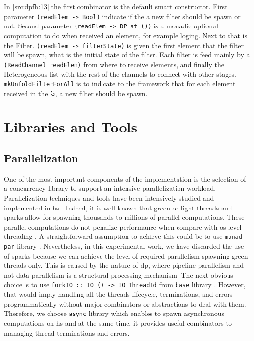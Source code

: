 In \autoref{src:dpfh:13} the first combinator is the default smart constructor. First parameter \texttt{(readElem -> Bool)} indicate if the a new filter should 
be spawn or not. Second parameter \texttt{(readElem -> DP st ())} is a monadic optional computation to do when received an element, for example loging.
Next to that is the Filter. \texttt{(readElem -> filterState)} is given the first element that the filter will be spawn, what is the initial state of the filter.
Each filter is feed mainly by a \texttt{(ReadChannel readElem)} from where to receive elements, and finally the Heterogeneous list with the rest of the channels to connect with other stages.
\texttt{mkUnfoldFilterForAll} is to indicate to the framework that for each element received in the $\mathsf{G}$, a new filter should be spawn. 

\section{Libraries and Tools}
\subsection{Parallelization} 
One of the most important components of the implementation is the selection of a concurrency library to support an intensive parallelization workload. Parallelization techniques and tools have been intensively studied and implemented in \acrshort{hs} \cite{monadpar}. Indeed, it is well known that green or light threads and sparks allow for spawning thousands to millions of parallel computations. These parallel computations do not penalize performance when compare with \acrfull{os} level threading \cite{parallelbook}. 
A straightforward assumption to achieve this could be to use \texttt{monad-par} library \cite{monadparlib, monadpar}. Nevertheless, in this experimental work, we have discarded the use of sparks \cite{sparks} because we can achieve the level of required parallelism spawning green threads only. This is caused by the nature of \acrshort{dp}, where pipeline parallelism and not data parallelism is a structural processing mechanism. The next obvious choice is to use \texttt{forkIO :: IO () -> IO ThreadId} from \texttt{base} library \cite{forkio}. 
However, that would imply handling all the threads lifecycle, terminations, and errors programmatically without major combinators or abstractions to deal with them. 
Therefore, we choose \texttt{async} library \cite{async}  which enables to spawn asynchronous computations \cite{parallelbook} on \acrshort{hs} and at the same time, it provides useful combinators to managing thread terminations and errors.


